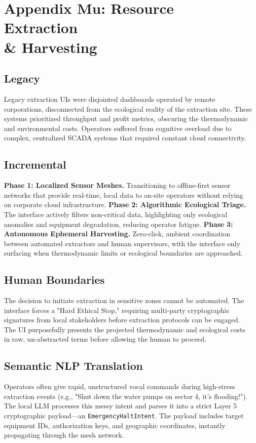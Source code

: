\chapter{Appendix Mu: Resource Extraction \\\& Harvesting}

\section{Legacy}
Legacy extraction UIs were disjointed dashboards operated by remote corporations, disconnected from the ecological reality of the extraction site. These systems prioritized throughput and profit metrics, obscuring the thermodynamic and environmental costs. Operators suffered from cognitive overload due to complex, centralized SCADA systems that required constant cloud connectivity.

\section{Incremental}
\textbf{Phase 1: Localized Sensor Meshes.} Transitioning to offline-first sensor networks that provide real-time, local data to on-site operators without relying on corporate cloud infrastructure.
\textbf{Phase 2: Algorithmic Ecological Triage.} The interface actively filters non-critical data, highlighting only ecological anomalies and equipment degradation, reducing operator fatigue.
\textbf{Phase 3: Autonomous Ephemeral Harvesting.} Zero-click, ambient coordination between automated extractors and human supervisors, with the interface only surfacing when thermodynamic limits or ecological boundaries are approached.

\section{Human Boundaries}
The decision to initiate extraction in sensitive zones cannot be automated. The interface forces a "Hard Ethical Stop," requiring multi-party cryptographic signatures from local stakeholders before extraction protocols can be engaged. The UI purposefully presents the projected thermodynamic and ecological costs in raw, un-abstracted terms before allowing the human to proceed.

\section{Semantic NLP Translation}
Operators often give rapid, unstructured vocal commands during high-stress extraction events (e.g., "Shut down the water pumps on sector 4, it's flooding!"). The local LLM processes this messy intent and parses it into a strict Layer 5 cryptographic payload—an \texttt{EmergencyHaltIntent}. The payload includes target equipment IDs, authorization keys, and geographic coordinates, instantly propagating through the mesh network.

